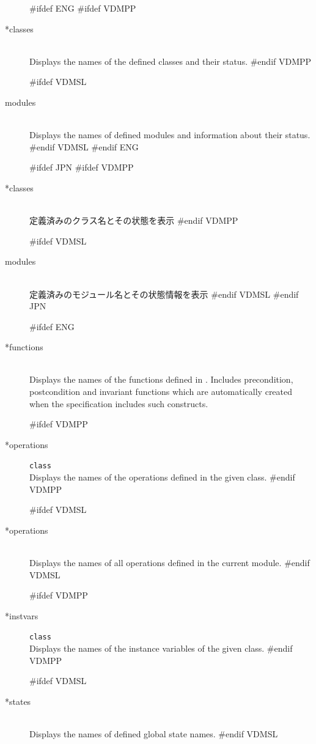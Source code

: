 \documentclass[\pformat,12pt]{article}
\begin{document}
\begin{description}

#ifdef ENG
#ifdef VDMPP
\item[*classes] \mbox{} \\
  Displays the names of the defined classes and their status.
#endif VDMPP

#ifdef VDMSL
\item[modules] \mbox{}\\
  Displays the names of defined modules and information about their
  status.
#endif VDMSL
#endif ENG

#ifdef JPN
#ifdef VDMPP
\item[*classes] \mbox{} \\
  定義済みのクラス名とその状態を表示
#endif VDMPP

#ifdef VDMSL
\item[modules] \mbox{}\\
  定義済みのモジュール名とその状態情報を表示
#endif VDMSL
#endif JPN

#ifdef ENG
\item[*functions]  \mbox{}\\ 
  Displays the names of the functions defined in
  .
  Includes precondition, postcondition and invariant functions which are
  automatically created when the specification includes such constructs.

#ifdef VDMPP
\item[*operations] {\tt class}\mbox{}\\
  Displays the names of  the operations defined in the given class.
#endif VDMPP

#ifdef VDMSL
\item[*operations] \mbox{}\\
  Displays the names of all operations defined in the current module.
#endif VDMSL

#ifdef VDMPP
\item[*instvars] {\tt class}\mbox{}\\
  Displays the names of the instance variables of the given class.
#endif VDMPP
  
#ifdef VDMSL
\item[*states]\mbox{}\\
  Displays the names of defined global state names.
#endif VDMSL


\end{description}
\end{document}
